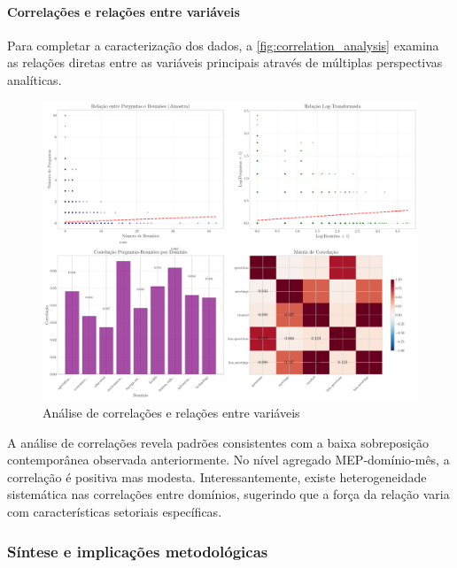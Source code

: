 \paragraph{Correlações e relações entre variáveis}

Para completar a caracterização dos dados, a \autoref{fig:correlation_analysis} examina as relações diretas entre as variáveis principais através de múltiplas perspectivas analíticas.

\begin{figure}[htbp]
\centering
\includegraphics[width=\textwidth]{figures/fig4_correlation_analysis.pdf}
\caption{Análise de correlações e relações entre variáveis}
\label{fig:correlation_analysis}
\end{figure}

A análise de correlações revela padrões consistentes com a baixa sobreposição contemporânea observada anteriormente. No nível agregado MEP-domínio-mês, a correlação é positiva mas modesta. Interessantemente, existe heterogeneidade sistemática nas correlações entre domínios, sugerindo que a força da relação varia com características setoriais específicas.

\subsubsection{Síntese e implicações metodológicas}

